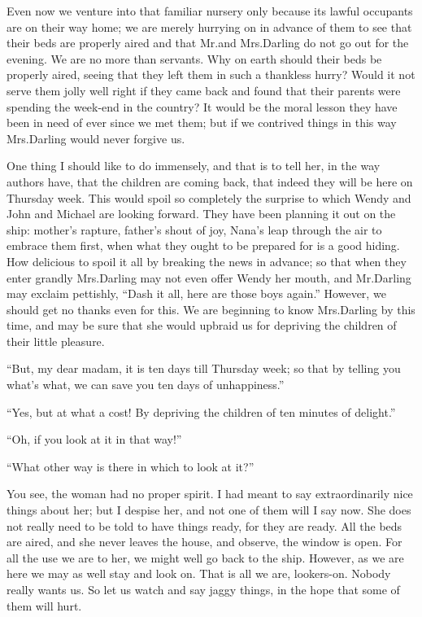 Even now we venture into that familiar nursery only because its lawful occupants are on their way home;
we are merely hurrying on in advance of them
to see that their beds are properly aired and that Mr.\@ and Mrs.\@ Darling do not go out for the evening.
We are no more than servants.
Why on earth should their beds be properly aired,
seeing that they left them in such a thankless hurry?
Would it not serve them jolly well right if they came back
and found that their parents were spending the week-end in the country?
It would be the moral lesson they have been in need of ever since we met them;
but if we contrived things in this way Mrs.\@ Darling would never forgive us.

One thing I should like to do immensely,
and that is to tell her, in the way authors have, that the children are coming back,
that indeed they will be here on Thursday week.
This would spoil so completely the surprise to which Wendy and John and Michael are looking forward.
They have been planning it out on the ship:
mother’s rapture, father’s shout of joy, Nana’s leap through the air to embrace them first,
when what they ought to be prepared for is a good hiding.
How delicious to spoil it all by breaking the news in advance;
so that when they enter grandly Mrs.\@ Darling may not even offer Wendy her mouth,
and Mr.\@ Darling may exclaim pettishly, “Dash it all, here are those boys again.”
However, we should get no thanks even for this.
We are beginning to know Mrs.\@ Darling by this time,
and may be sure that she would upbraid us for depriving the children of their little pleasure.

“But, my dear madam, it is ten days till Thursday week;
so that by telling you what’s what, we can save you ten days of unhappiness.”

“Yes, but at what a cost!
By depriving the children of ten minutes of delight.”

“Oh, if you look at it in that way!”

“What other way is there in which to look at it?”

You see, the woman had no proper spirit.
I had meant to say extraordinarily nice things about her;
but I despise her, and not one of them will I say now.
She does not really need to be told to have things ready, for they are ready.
All the beds are aired, and she never leaves the house, and observe, the window is open.
For all the use we are to her, we might well go back to the ship.
However, as we are here we may as well stay and look on.
That is all we are, lookers-on.
Nobody really wants us.
So let us watch and say jaggy things, in the hope that some of them will hurt.

